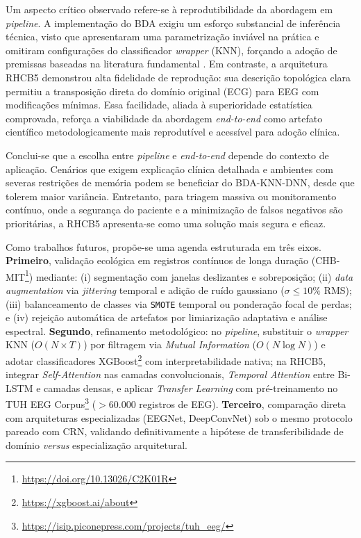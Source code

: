 \documentclass[alpha-refs,brazilian]{CC-EC_TF-TC}
\begin{document}
Um aspecto crítico observado refere-se à reprodutibilidade da abordagem em \textit{pipeline}. A implementação do BDA exigiu um esforço substancial de inferência técnica, visto que \cite{Yogarajan2023} apresentaram uma parametrização inviável na prática e omitiram configurações do classificador \textit{wrapper} (KNN), forçando a adoção de premissas baseadas na literatura fundamental \citep{Mirjalili2016}. Em contraste, a arquitetura RHCB5 \citep{Maggioni2024} demonstrou alta fidelidade de reprodução: sua descrição topológica clara permitiu a transposição direta do domínio original (ECG) para EEG com modificações mínimas. Essa facilidade, aliada à superioridade estatística comprovada, reforça a viabilidade da abordagem \textit{end-to-end} como artefato científico metodologicamente mais reprodutível e acessível para adoção clínica.

Conclui-se que a escolha entre \textit{pipeline} e \textit{end-to-end} depende do contexto de aplicação. Cenários que exigem explicação clínica detalhada e ambientes com severas restrições de memória podem se beneficiar do BDA-KNN-DNN, desde que tolerem maior variância. Entretanto, para triagem massiva ou monitoramento contínuo, onde a segurança do paciente e a minimização de falsos negativos são prioritárias, a RHCB5 apresenta-se como uma solução mais segura e eficaz.

Como trabalhos futuros, propõe-se uma agenda estruturada em três eixos. \textbf{Primeiro}, validação ecológica em registros contínuos de longa duração (CHB-MIT\footnote{\url{https://doi.org/10.13026/C2K01R}}) mediante: (i) segmentação com janelas deslizantes e sobreposição; (ii) \textit{data augmentation} via \textit{jittering} temporal e adição de ruído gaussiano ($\sigma \leq 10\%$ RMS); (iii) balanceamento de classes via \texttt{SMOTE} temporal ou ponderação focal de perdas; e (iv) rejeição automática de artefatos por limiarização adaptativa e análise espectral. \textbf{Segundo}, refinamento metodológico: no \textit{pipeline}, substituir o \textit{wrapper} KNN ($O(N \times T)$) por filtragem via \textit{Mutual Information} ($O(N \log N)$) e adotar classificadores XGBoost\footnote{\url{https://xgboost.ai/about}} com interpretabilidade nativa; na RHCB5, integrar \textit{Self-Attention} nas camadas convolucionais, \textit{Temporal Attention} entre Bi-LSTM e camadas densas, e aplicar \textit{Transfer Learning} com pré-treinamento no TUH EEG Corpus\footnote{\url{https://isip.piconepress.com/projects/tuh_eeg/}} ($> 60.000$ registros de EEG). \textbf{Terceiro}, comparação direta com arquiteturas especializadas (EEGNet, DeepConvNet) sob o mesmo protocolo pareado com CRN, validando definitivamente a hipótese de transferibilidade de domínio \textit{versus} especialização arquitetural.
\end{document}
